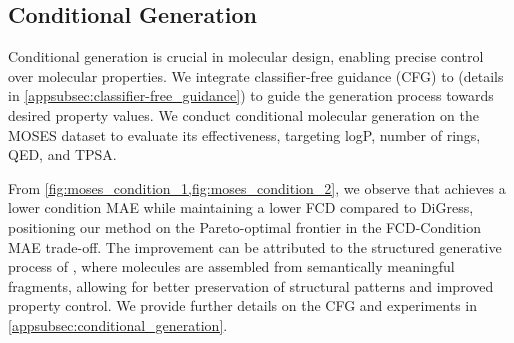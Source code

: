 

\subsection{Conditional Generation} 
\label{sec:conditional_generation}



Conditional generation is crucial in molecular design, enabling precise control over molecular properties.
We integrate classifier-free guidance (CFG) \citep{classifier_free_guidance,unlocking_guidance_dfm} to \methodname{} (details in \cref{appsubsec:classifier-free_guidance}) to guide the generation process towards desired property values. 
We conduct conditional molecular generation on the MOSES dataset to evaluate its effectiveness, targeting logP, number of rings, QED, and TPSA.

From \cref{fig:moses_condition_1,fig:moses_condition_2}, we observe that \methodname{} achieves a lower condition MAE while maintaining a lower FCD compared to DiGress, positioning our method on the Pareto-optimal frontier in the FCD-Condition MAE trade-off.
The improvement can be attributed to the structured generative process of \methodname{}, where molecules are assembled from semantically meaningful fragments, allowing for better preservation of structural patterns and improved property control. We provide further details on the CFG and experiments in \cref{appsubsec:conditional_generation}.


